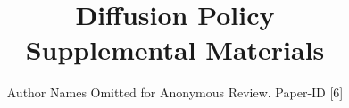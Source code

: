 \documentclass[conference]{IEEEtran}
\begin{document}
\title{Diffusion Policy \\ \LARGE{Supplemental Materials}}
\author{Author Names Omitted for Anonymous Review. Paper-ID [6]}






\maketitle
\IEEEpeerreviewmaketitle



% 
% 
% 
% 
% 
% 




\end{document}
